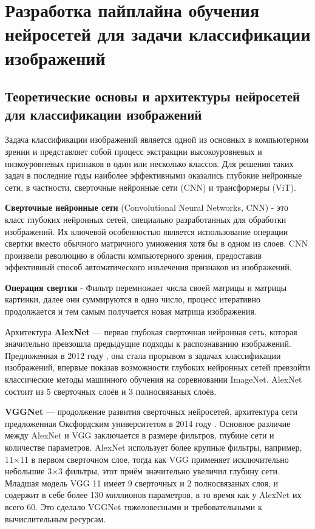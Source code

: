 \documentclass[14pt]{extarticle}
\begin{document}
\newpage
\section{Разработка пайплайна обучения нейросетей для задачи классификации изображений}

\subsection{Теоретические основы и архитектуры нейросетей для классификации изображений}
\hspace{1cm}
Задача классификации изображений является одной из основных в компьютерном зрении и представляет собой процесс экстракции высокоуровневых и низкоуровневых признаков в один или несколько классов. Для решения таких задач в последние годы наиболее эффективными оказались глубокие нейронные сети, в частности, сверточные нейронные сети (CNN) и трансформеры (ViT).

\textbf{Сверточные нейронные сети} (Convolutional Neural Networks, CNN) - это класс глубоких нейронных сетей, специально разработанных для обработки изображений. Их ключевой особенностью является использование операции свертки вместо обычного матричного умножения хотя бы в одном из слоев. CNN произвели революцию в области компьютерного зрения, предоставив эффективный способ автоматического извлечения признаков из изображений.

\textbf{Операция свертки} - Фильтр перемножает числа своей матрицы и матрицы картинки, далее они суммируются в одно число, процесс итеративно продолжается и тем самым получается новая матрица изображения.

\hspace{1cm}
Архитектура \textbf{AlexNet} — первая глубокая сверточная нейронная сеть, которая значительно превзошла предыдущие подходы к распознаванию изображений. Предложенная в 2012 году \cite{krizhevsky2012imagenet}, она стала прорывом в задачах классификации изображений, впервые показав возможности глубоких нейронных сетей превзойти классические методы машинного обучения на соревновании ImageNet. AlexNet состоит из 5 сверточных слоёв и 3 полносвязаных слоёв.

\hspace{1cm}
\textbf{VGGNet} — продолжение развития сверточных нейросетей, архитектура сети предложенная Оксфордским университетом в 2014 году \cite{simonyan2014vgg}. Основное различие между AlexNet и VGG заключается в размере фильтров, глубине сети и количестве параметров. AlexNet использует более крупные фильтры, например, 11×11 в первом сверточном слое, тогда как VGG применяет исключительно небольшие 3×3 фильтры, этот приём значительно увеличил глубину сети. Младшая модель VGG 11 имеет 9 сверточных и 2 полносвязаных слоя, и содержит в себе более 130 миллионов параметров, в то время как у AlexNet их всего 60. Это сделало VGGNet тяжеловесными и требовательными к вычислительным ресурсам.
\end{document}
